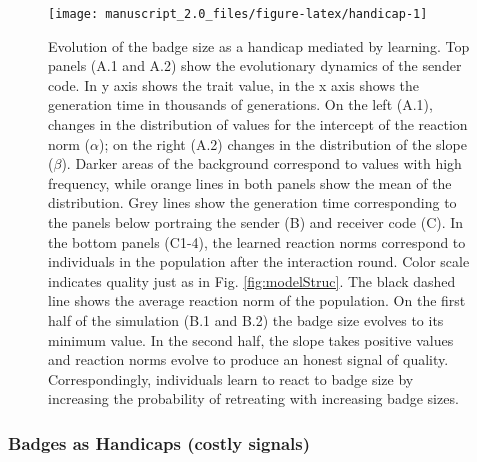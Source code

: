 \documentclass[
  12pt,
]{article}
\begin{document}
\begin{figure}

{\centering \texttt{[image: manuscript\_2.0\_files/figure-latex/handicap-1]} 

}

\caption{Evolution of the badge size as a handicap mediated by learning. Top panels (A.1 and A.2) show the evolutionary dynamics of the sender code. In y axis shows the trait value, in the x axis shows the generation time in thousands of generations. On the left (A.1), changes in the distribution of values for the intercept of the reaction norm ($\alpha$); on the right (A.2) changes in the distribution of the slope ($\beta$). Darker areas of the background correspond to values with high frequency, while orange lines in both panels show the mean of the distribution. Grey lines show the generation time corresponding to the panels below portraing the sender (B) and receiver code (C). In the bottom panels (C1-4), the learned reaction norms correspond to individuals in the population after the interaction round. Color scale indicates quality just as in Fig. \ref{fig:modelStruc}. The black dashed line shows the average reaction norm of the population. On the first half of the simulation (B.1 and B.2) the badge size evolves to its minimum value. In the second half, the slope takes positive values and reaction norms evolve to produce an honest signal of quality. Correspondingly, individuals learn to react to badge size by increasing the probability of retreating with increasing badge sizes.}\label{fig:handicap}
\end{figure}

\hypertarget{badges-as-handicaps-costly-signals}{%
\subsubsection{Badges as Handicaps (costly
signals)}\label{badges-as-handicaps-costly-signals}}
\end{document}
